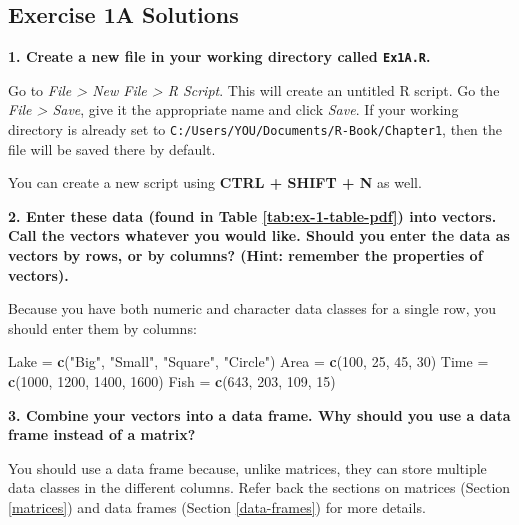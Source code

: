 \documentclass[]{book}
\newenvironment{Shaded}{\begin{snugshade}}{\end{snugshade}}
\newcommand{\DecValTok}[1]{\textcolor[rgb]{0.00,0.00,0.81}{#1}}
\newcommand{\KeywordTok}[1]{\textcolor[rgb]{0.13,0.29,0.53}{\textbf{#1}}}
\newcommand{\NormalTok}[1]{#1}
\newcommand{\StringTok}[1]{\textcolor[rgb]{0.31,0.60,0.02}{#1}}
\begin{document}
\hypertarget{ex1a-answers}{%
\subsection*{Exercise 1A Solutions}\label{ex1a-answers}}

\textbf{1. Create a new file in your working directory called \texttt{Ex1A.R}.}

Go to \emph{File \textgreater{} New File \textgreater{} R Script}. This will create an untitled R script. Go the \emph{File \textgreater{} Save}, give it the appropriate name and click \emph{Save}. If your working directory is already set to \texttt{C:/Users/YOU/Documents/R-Book/Chapter1}, then the file will be saved there by default.

You can create a new script using \textbf{CTRL + SHIFT + N} as well.

\textbf{2. Enter these data (found in Table \ref{tab:ex-1-table-pdf}) into vectors. Call the vectors whatever you would like. Should you enter the data as vectors by rows, or by columns? (Hint: remember the properties of vectors).}

Because you have both numeric and character data classes for a single row, you should enter them by columns:

\begin{Shaded}
\begin{Highlighting}[]
\NormalTok{Lake =}\StringTok{ }\KeywordTok{c}\NormalTok{(}\StringTok{"Big"}\NormalTok{, }\StringTok{"Small"}\NormalTok{, }\StringTok{"Square"}\NormalTok{, }\StringTok{"Circle"}\NormalTok{)}
\NormalTok{Area =}\StringTok{ }\KeywordTok{c}\NormalTok{(}\DecValTok{100}\NormalTok{, }\DecValTok{25}\NormalTok{, }\DecValTok{45}\NormalTok{, }\DecValTok{30}\NormalTok{)}
\NormalTok{Time =}\StringTok{ }\KeywordTok{c}\NormalTok{(}\DecValTok{1000}\NormalTok{, }\DecValTok{1200}\NormalTok{, }\DecValTok{1400}\NormalTok{, }\DecValTok{1600}\NormalTok{)}
\NormalTok{Fish =}\StringTok{ }\KeywordTok{c}\NormalTok{(}\DecValTok{643}\NormalTok{, }\DecValTok{203}\NormalTok{, }\DecValTok{109}\NormalTok{, }\DecValTok{15}\NormalTok{)}
\end{Highlighting}
\end{Shaded}

\textbf{3. Combine your vectors into a data frame. Why should you use a data frame instead of a matrix?}

You should use a data frame because, unlike matrices, they can store multiple data classes in the different columns. Refer back the sections on matrices (Section \ref{matrices}) and data frames (Section \ref{data-frames}) for more details.
\end{document}
